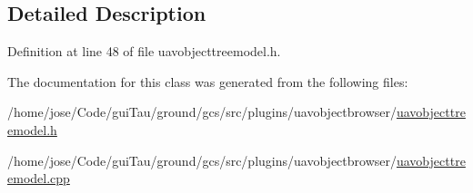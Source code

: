 \subsection{Detailed Description}


Definition at line 48 of file uavobjecttreemodel.\-h.



The documentation for this class was generated from the following files\-:\begin{DoxyCompactItemize}
\item 
/home/jose/\-Code/gui\-Tau/ground/gcs/src/plugins/uavobjectbrowser/\hyperlink{uavobjecttreemodel_8h}{uavobjecttreemodel.\-h}\item 
/home/jose/\-Code/gui\-Tau/ground/gcs/src/plugins/uavobjectbrowser/\hyperlink{uavobjecttreemodel_8cpp}{uavobjecttreemodel.\-cpp}\end{DoxyCompactItemize}
